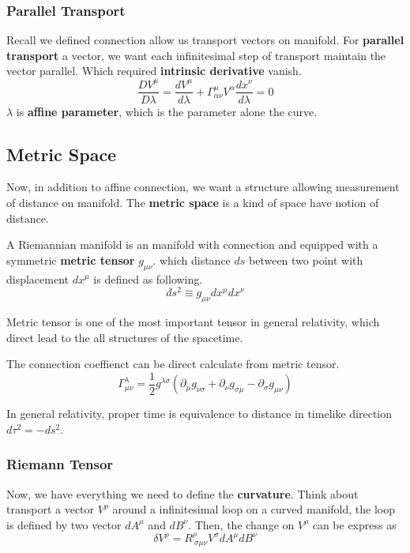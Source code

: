 \documentclass[12pt]{article}
\theoremstyle{mystyle}{\newtheorem{definition}{Definition}[section]}
\theoremstyle{mystyle}{\newtheorem{theorem}[definition]{Theorem}}
\theoremstyle{mystyle}{\newtheorem*{remark}{Remark}}
\theoremstyle{mystyle}{\newtheorem*{example}{Example}}
\theoremstyle{mystyle}{\newtheorem*{examples}{Examples}}
\theoremstyle{cstyle}{\newtheorem*{cthm}{}}
\begin{document}
\subsubsection{Parallel Transport}
Recall we defined connection allow us transport vectors on manifold.
For \textbf{parallel transport} a vector, we want each infinitesimal step of transport maintain the vector parallel.
Which required \textbf{intrinsic derivative} vanish.\[\frac{DV^{\mu}}{D\lambda} =
  \frac{dV^{\mu}}{d\lambda}+ \Gamma^{\mu}_{\alpha\nu}V^{\alpha}\frac{dx^{\nu}}{d\lambda} = 0\]
\(\lambda\) is \textbf{affine parameter}, which is the parameter alone the curve.

\subsection{Metric Space}
Now, in addition to affine connection, we want a structure allowing measurement of distance on manifold.
The \textbf{metric space} is a kind of space have notion of distance.
\begin{definition}
  A Riemannian manifold is an manifold with connection and equipped with a symmetric \textbf{metric tensor} \(g_{\mu\nu}\).
  which distance \(ds\) between two point with displacement \(dx^{\mu}\) is defined as following.
  \[ds^2 \equiv g_{\mu \nu} dx^{\mu} dx^{\nu}\]
\end{definition}
Metric tensor is one of the most important tensor in general relativity,
which direct lead to the all structures of the spacetime.
\begin{example}
  The connection coeffienct can be direct calculate from metric tensor.
  \[\Gamma_{\mu\nu}^{\lambda} = \frac{1}{2}g^{\lambda\sigma}(\partial_{\mu}g_{\nu\sigma}+ \partial_{\nu}g_{\sigma\mu}
    - \partial_{\sigma}g_{\mu\nu})\]
\end{example}
In general relativity, proper time is equivalence to distance in timelike direction \(d\tau^2 = - ds^2\).

\subsubsection{Riemann Tensor}
Now, we have everything we need to define the \textbf{curvature}. Think about transport a vector \(V^\rho\)
around a infinitesimal loop on a curved manifold, the loop is defined by two vector \(dA^\mu\) and \(dB^\nu\).
Then, the change on \(V^\rho\) can be express as \[\delta V^\rho = R^{\rho}_{\ \sigma\mu\nu}V^{\sigma}dA^{\mu}dB^{\nu}\]
\end{document}
